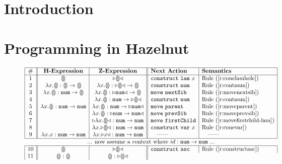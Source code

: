 \documentclass{llncs}
\begin{document}
\section{Introduction}
%


\section{Programming in Hazelnut}
\label{sec:example}
\begin{figure}[t]
\[
\begin{array}{|c||c|c||l|l|}
\hline
\# & \textbf{H-Expression} & \textbf{Z-Expression} & \textbf{Next Action} & \textbf{Semantics}
\\
\hline
1 &
\hhole{} &
\zwsel{\hhole{}}
&
\aConstruct{\flam{x}} & \refrule{\ref{r:conelamhole}}
\\ 2 &
\hlam{x}{\hhole{}} : \tarr{\hhole{}}{\hhole{}} &
\hlam{x}{\hhole{}} : \tarr{\zwsel{\hhole{}}}{\hhole{}}
&
\aConstruct{\fnum{}} & \refrule{\ref{r:contnum}}
\\ 3 &
\hlam{x}{\hhole{}} : \tarr{\tnum{}}{\hhole{}} &
\hlam{x}{\hhole{}} : \tarr{\zwsel{\tnum{}}}{\hhole{}}
&
\aMove{\dNext{}} & \refrule{\ref{r:movenextsib}}
\\ 4 &
&
\hlam{x}{\hhole{}} : \tarr{\tnum}{\zwsel{\hhole{}}}
&
\aConstruct{\fnum{}} & \refrule{\ref{r:contnum}}
\\ 5 &
\hlam{x}{\hhole{}} : \tarr{\tnum{}}{\tnum{}} &
\hlam{x}{\hhole{}} : \tarr{\tnum{}}{\zwsel{\tnum{}}}
&
\aMove{\dParent{}} & \refrule{\ref{r:moveparent}}
\\ 6 &
&
\hlam{x}{\hhole{}} : \zwsel{\tarr{\tnum{}}{\tnum{}}}
&
\aMove{\dPrev{}} & \refrule{\ref{r:moveprevsib}}
\\ 7 &
&
\zwsel{\hlam{x}{\hhole{}}} : \tarr{\tnum{}}{\tnum{}}
&
\aMove{\dChild{}} & \refrule{\ref{r:movefirstchild-lam}}
\\ 8 &
&
\hlam{x}{\zwsel{\hhole{}}} : \tarr{\tnum{}}{\tnum{}}
&
\aConstruct{\fvar{x}} & \refrule{\ref{r:conevar}}
\\ 9 &
\hlam{x}{{x}} : \tarr{\tnum{}}{\tnum{}}
&
\hlam{x}{\zwsel{{x}}} : \tarr{\tnum{}}{\tnum{}}
&
\quad\textrm{---{}---}
&
\quad\textrm{---{}---}
\\
\hline
\multicolumn{5}{c}{\text{... now assume a context where $id : \tarr{\tnum}{\tnum}$ ...}}\\
\hline
10 &
\hhole{} &
\zwsel{\hhole{}}
&
\aConstruct{\fasc} & \refrule{\ref{r:constructasc}}
\\
11 &
\hhole{} : \hhole{} &
\hhole{} : \zwsel{ \hhole{}}

\end{array}\]
\end{figure}
\end{document}
